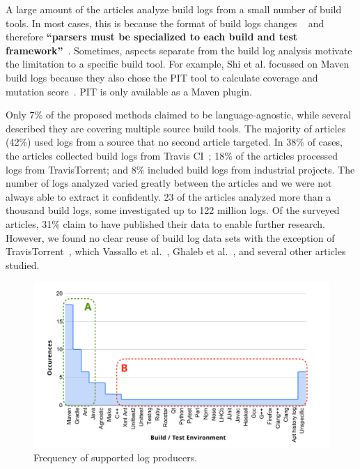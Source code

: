 A large amount of the articles analyze build logs
from a small number of build tools.
In most cases, this is because the format of build logs changes
~\cite{staahl2014modeling} and
therefore \textbf{``parsers must be specialized to each build and test
framework''}~\cite{tomassi2019bugswarm}.
Sometimes, aspects separate from the build log analysis motivate
the limitation to a specific build tool.
For example, Shi et al. focussed on Maven
build logs because they also chose the PIT tool to calculate coverage
and mutation score~\cite{shi2018evaluating}. PIT is only available as a Maven plugin.

Only 7\% of the proposed methods claimed to be language-agnostic, while
several described they are covering multiple source build tools.
The majority of articles (42\%) used logs from a source that no
second article
targeted.
In 38\% of cases, the articles collected build logs from Travis
CI~\cite{travisci2019webpage};
18\% of the articles processed logs from TravisTorrent; and 8\% included
build logs from industrial projects.
The number of logs analyzed varied greatly between the articles
and we were not always able to
extract it confidently.
23 of the articles analyzed more than a thousand build logs, some
investigated up to 122 million logs.
Of the surveyed articles, 31\% claim to have published their data to
enable further research.
However, we found no clear reuse of build log data sets with the
exception of TravisTorrent~\cite{beller2017travistorrent}, which
Vassallo et al.~\cite{vassallo2017a-tale},
Ghaleb et al.~\cite{ghaleb2019studying},
and several other articles studied.

\begin{figure}[tbhp]
		\centering
		\includegraphics[width=\columnwidth, trim={1.1cm 0.4cm
		1.5cm 0.5cm},
		clip]{img/lit-sur/log_producer_annotated.pdf}
		\caption{Frequency of supported log producers.}
		\label{fig:litsur:log_producer}
\end{figure}


